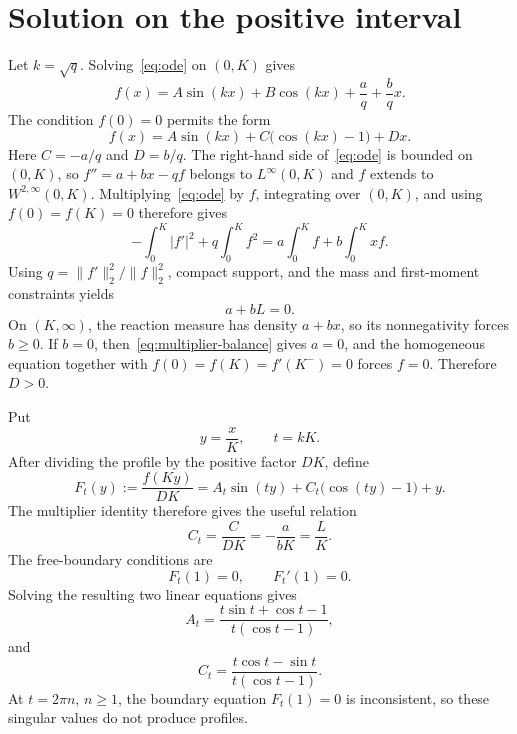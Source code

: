 \documentclass[11pt]{article}
\theoremstyle{definition}
\theoremstyle{remark}
\begin{document}
\section{Solution on the positive interval}
Let $k=\sqrt q$. Solving~\eqref{eq:ode} on $(0,K)$ gives
\[
 f(x)=A\sin(kx)+B\cos(kx)+\frac{a}{q}+\frac{b}{q}x.
\]
The condition $f(0)=0$ permits the form
\[
 f(x)=A\sin(kx)+C\bigl(\cos(kx)-1\bigr)+Dx.
\]
Here $C=-a/q$ and $D=b/q$. The right-hand side of~\eqref{eq:ode} is bounded
on $(0,K)$, so $f''=a+bx-qf$ belongs to $L^\infty(0,K)$ and $f$ extends to
$W^{2,\infty}(0,K)$. Multiplying~\eqref{eq:ode} by $f$, integrating over
$(0,K)$, and using $f(0)=f(K)=0$ therefore gives
\[
 -\int_0^K |f'|^2+q\int_0^K f^2
 =a\int_0^K f+b\int_0^K xf.
\]
Using $q=\|f'\|_2^2/\|f\|_2^2$, compact support, and the mass and
first-moment constraints yields
\begin{equation}\label{eq:multiplier-balance}
 a+bL=0.
\end{equation}
On $(K,\infty)$, the reaction measure has density $a+bx$, so its
nonnegativity forces $b\geq0$. If $b=0$, then~\eqref{eq:multiplier-balance}
gives $a=0$, and the homogeneous equation together with
$f(0)=f(K)=f'(K^-)=0$ forces $f=0$. Therefore $D>0$.

Put
\[
 y=\frac{x}{K},
 \qquad t=kK.
\]
After dividing the profile by the positive factor $DK$, define
\begin{equation}\label{eq:F}
 F_t(y):=\frac{f(Ky)}{DK}
 =A_t\sin(ty)+C_t\bigl(\cos(ty)-1\bigr)+y.
\end{equation}
The multiplier identity therefore gives the useful relation
\begin{equation}\label{eq:C-support}
 C_t=\frac{C}{DK}=-\frac{a}{bK}=\frac{L}{K}.
\end{equation}
The free-boundary conditions are
\[
 F_t(1)=0,
 \qquad F_t'(1)=0.
\]
Solving the resulting two linear equations gives
\begin{equation}\label{eq:A}
 A_t=\frac{t\sin t+\cos t-1}{t(\cos t-1)},
\end{equation}
and
\begin{equation}\label{eq:C}
 C_t=\frac{t\cos t-\sin t}{t(\cos t-1)}.
\end{equation}
At $t=2\pi n$, $n\geq1$, the boundary equation $F_t(1)=0$ is inconsistent,
so these singular values do not produce profiles.
\end{document}
